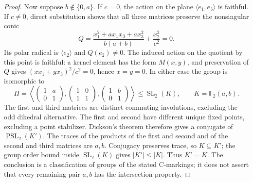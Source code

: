 \documentclass[11pt]{article}
\newcommand{\F}{\mathbb F}
\newcommand{\PSL}{\operatorname{PSL}}
\newcommand{\SL}{\operatorname{SL}}
\begin{document}
\begin{proof}
Now suppose $b\notin\{0,a\}$. If $c=0$, the action on the plane
$\langle e_1,e_3\rangle$ is faithful. If $c\ne0$, direct substitution
shows that all three matrices preserve the nonsingular conic
\[
 Q=\frac{x_1^2+a x_1x_3+a x_3^2}{b(a+b)}+\frac{x_2^2}{c^2}=0.
\]
Its polar radical is $\langle e_2\rangle$ and $Q(e_2)\ne0$.
The induced action on the quotient by this point is faithful: a kernel
element has the form $M(x,y)$, and preservation of $Q$ gives
$(x x_1+y x_3)^2/c^2=0$, hence $x=y=0$. In either case the group is
isomorphic to
\[
 H=\left\langle
 \begin{pmatrix}1&a\\0&1\end{pmatrix},
 \begin{pmatrix}1&0\\1&1\end{pmatrix},
 \begin{pmatrix}1&b\\0&1\end{pmatrix}\right\rangle
 \le\SL_2(K),\qquad K=\F_2(a,b).
\]
The first and third matrices are distinct commuting involutions, excluding
the odd dihedral alternative. The first and second have different unique
fixed points, excluding a point stabilizer. Dickson's theorem therefore
gives a conjugate of $\PSL_2(K')$. The traces of the products of the
first and second and of the second and third matrices are $a,b$.
Conjugacy preserves trace, so $K\subseteq K'$; the group order bound
inside $\SL_2(K)$ gives $|K'|\le|K|$. Thus $K'=K$.
The conclusion is a classification of groups of the stated C-markings;
it does not assert that every remaining pair $a,b$ has the intersection
property.
\end{proof}
\end{document}
